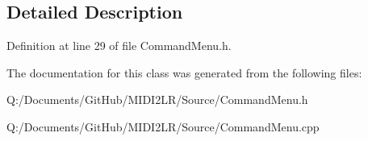 \subsection{Detailed Description}


Definition at line 29 of file Command\+Menu.\+h.



The documentation for this class was generated from the following files\+:\begin{DoxyCompactItemize}
\item 
Q\+:/\+Documents/\+Git\+Hub/\+M\+I\+D\+I2\+L\+R/\+Source/Command\+Menu.\+h\item 
Q\+:/\+Documents/\+Git\+Hub/\+M\+I\+D\+I2\+L\+R/\+Source/Command\+Menu.\+cpp\end{DoxyCompactItemize}
